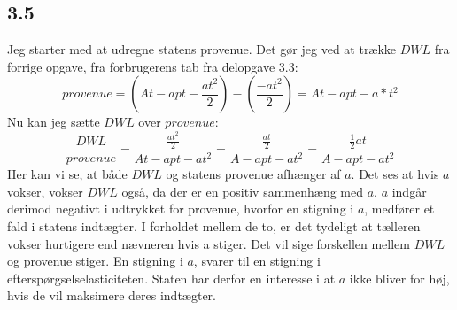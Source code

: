 \documentclass{article}
\begin{document}
\subsection*{3.5}
Jeg starter med at udregne statens provenue. Det gør jeg ved at trække $DWL$ fra forrige opgave, fra forbrugerens tab fra delopgave 3.3:
\begin{equation}
    provenue = (At-apt-\frac{at^2}{2}) - (\frac{-at^2}{2}) = At-apt-a*t^2
\end{equation}
Nu kan jeg sætte $DWL$ over $provenue$:
\begin{equation}
    \frac{DWL}{provenue}=\frac{\frac{at^2}{2}}{At-apt-at^2} = \frac{\frac{at}{2}}{A-apt-at^2} = \frac{\frac{1}{2}at}{A-apt-at^2}
\end{equation}
Her kan vi se, at både $DWL$ og statens provenue afhænger af $a$. Det ses at hvis $a$ vokser, vokser $DWL$ også, da der er en positiv sammenhæng med $a$. $a$ indgår derimod negativt i udtrykket for provenue, hvorfor en stigning i $a$, medfører et fald i statens indtægter. I forholdet mellem de to, er det tydeligt at tælleren vokser hurtigere end nævneren hvis a stiger. Det vil sige forskellen mellem $DWL$ og provenue stiger. En stigning i $a$, svarer til en stigning i efterspørgselselasticiteten. Staten har derfor en interesse i at $a$ ikke bliver for høj, hvis de vil maksimere deres indtægter. 
\end{document}
